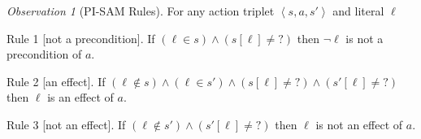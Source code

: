 \documentclass{article}
\theoremstyle{plain}
\theoremstyle{definition}
\theoremstyle{remark}
\theoremstyle{observation}
\newtheorem{observation}[theorem]{Observation}
\newcommand{\tuple}[1]{\ensuremath{\left \langle #1 \right \rangle }}
\newcommand{\pre}{\textit{pre}}
\newcommand{\eff}{\textit{eff}}
\newcommand{\true}{\textit{true}}
\newcommand{\false}{\textit{false}}
\newcommand{\unobserved}{\textit{?}}
\begin{document}
\begin{observation}[PI-SAM Rules]\label{obs:pi-sam-learning-rules}
For any action triplet $\tuple{s, a, s'}$ and literal $\ell$%
\begin{compactitem}
    \item[Rule 1][not a precondition]. If $\left(\ell\in s\right)\wedge
    \left(s[\ell]\neq\unobserved\right)$ 
    then $\neg \ell$ is not a precondition of $a$. 
    \item[Rule 2][an effect]. If 
    $\left(\ell\notin s\right)\wedge
     \left(\ell\in s'\right)\wedge
    \left(s[\ell]\neq\unobserved\right)\wedge
     \left(s'[\ell]\neq\unobserved\right)$ then $\ell$ is an effect of $a$.
    \item[Rule 3][not an effect]. If 
    $\left(\ell\notin s'\right)\wedge
    \left(s'[\ell]\neq\unobserved\right)$ then $\ell$ is not an effect of $a$.


    

    
    
    
\end{compactitem}
\end{observation}
\end{document}
